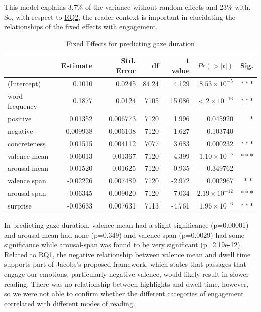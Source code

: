 \documentclass[11pt]{article}
\begin{document}
This model explains 3.7\% of the variance without random effects and 23\% with. So, with respect to \hyperref[subsection:rq2]{RQ2}, the reader context is important in elucidating the relationships of the fixed effects with engagement.

\begin{table}[h]
  \centering
  \begin{tabular}{|l|r|r|r|r|r|r|}
  \hline
  & Estimate & Std. Error & df & t value & $Pr(>|t|)$ & Sig. \\
  \hline
  (Intercept) & 0.1010 & 0.0245 & 84.24 & 4.129 & $8.53 \times 10^{-5}$ & $\ast\ast\ast$ \\
  word frequency & 0.1877 & 0.0124 & 7105 & 15.086 & $< 2 \times 10^{-16}$ & $\ast\ast\ast$ \\
  positive & 0.01352 & 0.006773 & 7120 & 1.996 & 0.045920 & $\ast$ \\
  negative & 0.009938 & 0.006108 & 7120 & 1.627 & 0.103740 & \\
  concreteness & 0.01515 & 0.004112 & 7077 & 3.683 & 0.000232 & $\ast\ast\ast$ \\
  valence mean & -0.06013 & 0.01367 & 7120 & -4.399 & $1.10 \times 10^{-5}$ & $\ast\ast\ast$ \\
  arousal mean & -0.01520 & 0.01625 & 7120 & -0.935 & 0.349762 & \\
  valence span & -0.02226 & 0.007489 & 7120 & -2.972 & 0.002967 & $\ast\ast$ \\
  arousal span & -0.06345 & 0.009020 & 7120 & -7.034 & $2.19 \times 10^{-12}$ & $\ast\ast\ast$ \\
  surprise & -0.03633 & 0.007631 & 7113 & -4.761 & $1.96 \times 10^{-6}$ & $\ast\ast\ast$ \\
  \hline
  \end{tabular}
  \caption{Fixed Effects for predicting gaze duration}
  \label{tab:third}
  \end{table}
  
In predicting gaze duration, valence mean had a slight significance (p=0.00001) and arousal mean had none (p=0.349) and valence-span (p=0.0029) had some significance while arousal-span was found to be very significant (p=2.19e-12). Related to \hyperref[subsection:rq1]{RQ1}, the negative relationship between valence mean and dwell time supports part of Jacobs's proposed framework, which states that passages that engage our emotions, particularly negative valence, would likely result in slower reading. There was no relationship between highlights and dwell time, however, so we were not able to confirm whether the different categories of engagement correlated with different modes of reading.
\end{document}
